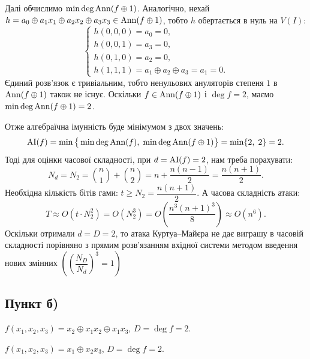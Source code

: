 Далі обчислимо $\min \deg \operatorname{Ann}(f \oplus 1)$. Аналогічно, нехай $h = a_0 \oplus a_1 x_1 \oplus a_2 x_2 \oplus a_3 x_3 \in \operatorname{Ann}(f \oplus 1)$, 
тобто $h$ обертається в нуль на $V(I)$:
\begin{equation*}
    \begin{cases}
        h(0,0,0) = a_0 = 0, \\
        h(0,0,1) = a_3 = 0, \\
        h(0,1,0) = a_2 = 0, \\
        h(1,1,1) = a_1 \oplus a_2 \oplus a_3 = a_1 = 0.
    \end{cases}
\end{equation*}
Єдиний розв'язок є тривіальним, тобто ненульових ануляторів степеня $1$ в $\operatorname{Ann}(f \oplus 1)$ також не існує. 
Оскільки $f \in \operatorname{Ann}(f \oplus 1)$ і $\deg f = 2$, маємо $\min \deg \operatorname{Ann}(f \oplus 1) = 2$.

\noindent Отже алгебраїчна імунність буде мінімумом з двох значень:
\begin{equation*}
    \operatorname{AI}(f) = \min\big\{\min \deg \operatorname{Ann}(f),\; \min \deg \operatorname{Ann}(f \oplus 1)\big\} = \min\{2,\; 2\} = 2.
\end{equation*}
Тоді для оцінки часової складності, при $d = \operatorname{AI}(f) = 2$, нам треба порахувати:
\begin{equation*}
    N_{d} = N_{2} = \binom{n}{1} + \binom{n}{2} = n + \frac{n(n-1)}{2} = \frac{n(n+1)}{2}.
\end{equation*}
Необхідна кількість бітів гами: $t \geq N_2 = \dfrac{n(n+1)}{2}$. А часова складність атаки:
\begin{equation*}
    T \approx O \left(t \cdot N_2^2\right) = O \left(N_2^3\right) = O\!\left(\frac{n^3(n+1)^3}{8}\right) \approx O(n^6).
\end{equation*}
Оскільки отримали $d = D = 2$, то атака Куртуа--Майєра не дає виграшу в часовій складності порівняно з
прямим розв'язанням вхідної системи методом введення нових змінних $(\left(\dfrac{N_D}{N_d}\right)^{3} = 1)$

\subsection*{Пункт б)}

$f(x_1, x_2, x_3) = x_2 \oplus x_1 x_2 \oplus x_1 x_3$, $D = \deg f = 2$.

$f(x_1, x_2, x_3) = x_1 \oplus x_2 x_3$, $D = \deg f = 2$.

